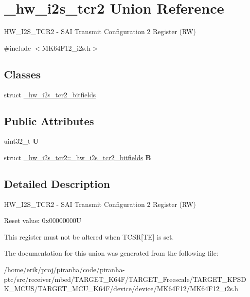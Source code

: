 \hypertarget{union__hw__i2s__tcr2}{}\section{\+\_\+hw\+\_\+i2s\+\_\+tcr2 Union Reference}
\label{union__hw__i2s__tcr2}


H\+W\+\_\+\+I2\+S\+\_\+\+T\+C\+R2 -\/ S\+AI Transmit Configuration 2 Register (RW)  




{\ttfamily \#include $<$M\+K64\+F12\+\_\+i2s.\+h$>$}

\subsection*{Classes}
\begin{DoxyCompactItemize}
\item 
struct \hyperlink{struct__hw__i2s__tcr2_1_1__hw__i2s__tcr2__bitfields}{\+\_\+hw\+\_\+i2s\+\_\+tcr2\+\_\+bitfields}
\end{DoxyCompactItemize}
\subsection*{Public Attributes}
\begin{DoxyCompactItemize}
\item 
uint32\+\_\+t {\bfseries U}\hypertarget{union__hw__i2s__tcr2_ad1496ce8114c2fb0650132b832551eb3}{}\label{union__hw__i2s__tcr2_ad1496ce8114c2fb0650132b832551eb3}

\item 
struct \hyperlink{struct__hw__i2s__tcr2_1_1__hw__i2s__tcr2__bitfields}{\+\_\+hw\+\_\+i2s\+\_\+tcr2\+::\+\_\+hw\+\_\+i2s\+\_\+tcr2\+\_\+bitfields} {\bfseries B}\hypertarget{union__hw__i2s__tcr2_a828d6624fe7efcc627908efbd0842982}{}\label{union__hw__i2s__tcr2_a828d6624fe7efcc627908efbd0842982}

\end{DoxyCompactItemize}


\subsection{Detailed Description}
H\+W\+\_\+\+I2\+S\+\_\+\+T\+C\+R2 -\/ S\+AI Transmit Configuration 2 Register (RW) 

Reset value\+: 0x00000000U

This register must not be altered when T\+C\+SR\mbox{[}TE\mbox{]} is set. 

The documentation for this union was generated from the following file\+:\begin{DoxyCompactItemize}
\item 
/home/erik/proj/piranha/code/piranha-\/ptc/src/receiver/mbed/\+T\+A\+R\+G\+E\+T\+\_\+\+K64\+F/\+T\+A\+R\+G\+E\+T\+\_\+\+Freescale/\+T\+A\+R\+G\+E\+T\+\_\+\+K\+P\+S\+D\+K\+\_\+\+M\+C\+U\+S/\+T\+A\+R\+G\+E\+T\+\_\+\+M\+C\+U\+\_\+\+K64\+F/device/device/\+M\+K64\+F12/M\+K64\+F12\+\_\+i2s.\+h\end{DoxyCompactItemize}
